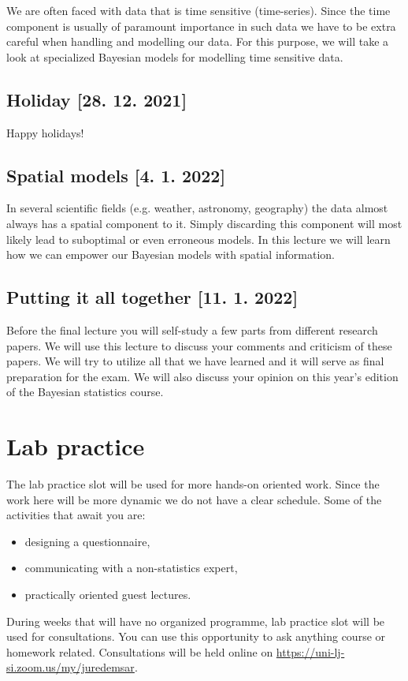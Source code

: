 \documentclass[fleqn,moreauthors,10pt]{ds_report}
\begin{document}
We are often faced with data that is time sensitive (time-series). Since the time component is usually of paramount importance in such data we have to be extra careful when handling and modelling our data. For this purpose, we will take a look at specialized Bayesian models for modelling time sensitive data.

\subsection*{Holiday [28. 12. 2021]}

Happy holidays!

\subsection*{Spatial models [4. 1. 2022]}

In several scientific fields (e.g. weather, astronomy, geography) the data almost always has a spatial component to it. Simply discarding this component will most likely lead to suboptimal or even erroneous models. In this lecture we will learn how we can empower our Bayesian models with spatial information.

\subsection*{Putting it all together [11. 1. 2022]}

Before the final lecture you will self-study a few parts from different research papers. We will use this lecture to discuss your comments and criticism of these papers. We will try to utilize all that we have learned and it will serve as final preparation for the exam. We will also discuss your opinion on this year's edition of the Bayesian statistics course.

\section*{Lab practice}

The lab practice slot will be used for more hands-on oriented work. Since the work here will be more dynamic we do not have a clear schedule. Some of the activities that await you are:

\begin{itemize}
	\item designing a questionnaire,
	\item communicating with a non-statistics expert,
	\item practically oriented guest lectures.
\end{itemize}

During weeks that will have no organized programme, lab practice slot will be used for consultations. You can use this opportunity to ask anything course or homework related. Consultations will be held online on \url{https://uni-lj-si.zoom.us/my/juredemsar}.
\end{document}
